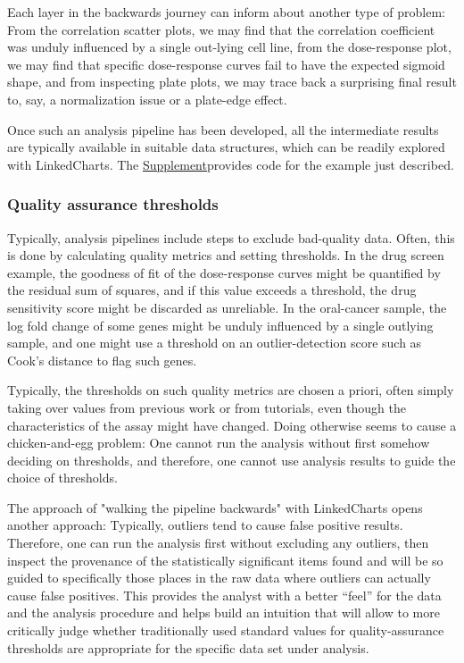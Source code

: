\documentclass[twocolumn,10pt]{article}
\newcommand{\Supplement}{\href{https://anders-biostat.github.io/lc-paper/}{Supplement}}
\begin{document}
Each layer in the backwards journey can inform about another type of problem: From the correlation scatter plots, we may find that the correlation coefficient was unduly influenced by a single out-lying cell line, from the dose-response plot, we may find that specific dose-response curves fail to have the expected sigmoid shape, and from inspecting plate plots, we may trace back a surprising final result to, say, a normalization issue or a plate-edge effect.

Once such an analysis pipeline has been developed, all the intermediate results are typically available in suitable data structures, which can be readily explored with LinkedCharts. The \Supplement provides code for the example just described.

\subsubsection{Quality assurance thresholds}

Typically, analysis pipelines include steps to exclude bad-quality data. Often, this is done by calculating quality metrics and setting thresholds. In the drug screen example, the goodness of fit of the dose-response curves might be quantified by the residual sum of squares, and if this value exceeds a threshold, the drug sensitivity score might be discarded as unreliable. In the oral-cancer sample, the log fold change of some genes might be unduly influenced by a single outlying sample, and one might use a threshold on an outlier-detection score such as Cook's distance to flag such genes.

Typically, the thresholds on such quality metrics are chosen a priori, often simply taking over values from previous work or from tutorials, even though the characteristics of the assay might have changed. Doing otherwise seems to cause a chicken-and-egg problem: One cannot run the analysis without first somehow deciding on thresholds, and therefore, one cannot use analysis results to guide the choice of thresholds.

The approach of "walking the pipeline backwards" with LinkedCharts opens another approach: Typically, outliers tend to cause false positive results. Therefore, one can run the analysis first without excluding any outliers, then inspect the provenance of the statistically significant items found and will be so guided to specifically those places in the raw data where outliers can actually cause false positives. This provides the analyst with a better ``feel'' for the data and the analysis procedure and helps build an intuition that will allow to more critically judge whether traditionally used standard values for quality-assurance thresholds are appropriate for the specific data set under analysis. 
\end{document}
